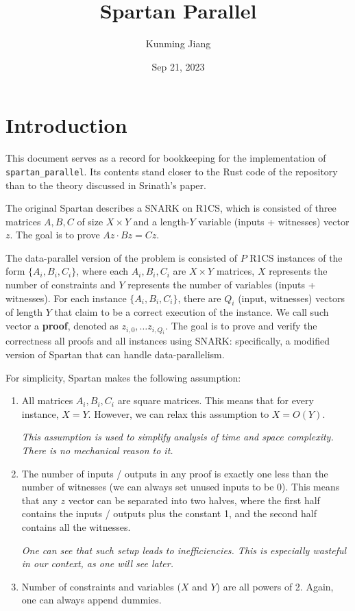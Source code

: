 \documentclass{article}
\title{Spartan Parallel}
\author{Kunming Jiang}
\date{Sep 21, 2023}
\newcommand{\code}{\texttt}
\begin{document}
\maketitle

\section{Introduction}\label{intro}

This document serves as a record for bookkeeping for the implementation of \code{spartan\_parallel}. Its contents stand closer to the Rust code of the repository than to the theory discussed in Srinath's paper.

The original Spartan describes a SNARK on R1CS, which is consisted of three matrices $A, B, C$ of size $X \times Y$ and a length-$Y$ variable (inputs + witnesses) vector $z$. The goal is to prove $Az\cdot Bz = Cz$.

The data-parallel version of the problem is consisted of $P$ R1CS instances of the form $\{A_i, B_i, C_i\}$, where each $A_i, B_i, C_i$ are $X \times Y$ matrices, $X$ represents the number of constraints and $Y$ represents the number of variables (inputs + witnesses). For each instance $\{A_i, B_i, C_i\}$, there are $Q_i$ (input, witnesses) vectors of length $Y$ that claim to be a correct execution of the instance. We call such vector a \textbf{proof}, denoted as $z_{i, 0},\dots z_{i, Q_i}$. The goal is to prove and verify the correctness all proofs and all instances using SNARK: specifically, a modified version of Spartan that can handle data-parallelism.

For simplicity, Spartan makes the following assumption:
\begin{enumerate}
    \item All matrices $A_i, B_i, C_i$ are square matrices. This means that for every instance, $X = Y$. However, we can relax this assumption to $X = O(Y)$. \label{ass:square}
    
    \emph{This assumption is used to simplify analysis of time and space complexity. There is no mechanical reason to it.}

    \item The number of inputs / outputs in any proof is exactly one less than the number of witnesses (we can always set unused inputs to be 0). This means that any $z$ vector can be separated into two halves, where the first half contains the inputs / outputs plus the constant 1, and the second half contains all the witnesses. \label{ass:num_of_inputs}
    
    \emph{One can see that such setup leads to inefficiencies. This is especially wasteful in our context, as one will see later.}

    \item Number of constraints and variables ($X$ and $Y$) are all powers of 2. Again, one can always append dummies. \label{ass:x_y_pow2}
\end{enumerate}
\end{document}
